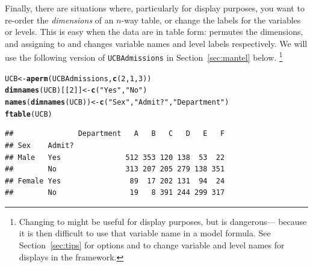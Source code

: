 \documentclass[10pt,twoside]{article}\usepackage[]{graphicx}\usepackage[]{color}
\makeatletter
\newcommand{\hlnum}[1]{\textcolor[rgb]{0.686,0.059,0.569}{#1}}%
\newcommand{\hlstr}[1]{\textcolor[rgb]{0.192,0.494,0.8}{#1}}%
\newcommand{\hlstd}[1]{\textcolor[rgb]{0.345,0.345,0.345}{#1}}%
\newcommand{\hlkwb}[1]{\textcolor[rgb]{0.69,0.353,0.396}{#1}}%
\newcommand{\hlkwd}[1]{\textcolor[rgb]{0.737,0.353,0.396}{\textbf{#1}}}%
\newenvironment{kframe}{%
 \def\at@end@of@kframe{}%
 \ifinner\ifhmode%
  \def\at@end@of@kframe{\end{minipage}}%
  \begin{minipage}{\columnwidth}%
 \fi\fi%
 \def\FrameCommand##1{\hskip\@totalleftmargin \hskip-\fboxsep
 \colorbox{shadecolor}{##1}\hskip-\fboxsep
     \hskip-\linewidth \hskip-\@totalleftmargin \hskip\columnwidth}%
 \MakeFramed {\advance\hsize-\width
   \@totalleftmargin\z@ \linewidth\hsize
   \@setminipage}}%
 {\par\unskip\endMakeFramed%
 \at@end@of@kframe}
\newenvironment{knitrout}{}{} %
\newcommand{\secref}[1]{Section~\ref{#1}}
\newcommand{\data}[1]{\texttt{#1}}
\newcommand{\codefun}[1]{\code{#1()}}
\makeatother
\begin{document}
Finally, there are situations where, particularly for display purposes, you
want to re-order the \emph{dimensions} of an $n$-way table, or change the
labels for the variables or levels.
This is easy when the data are in table form: \codefun{aperm} permutes
the dimensions, and assigning to  and 
changes variable names and level labels respectively.
We will use the following version of \data{UCBAdmissions} in
\secref{sec:mantel} below.%
\footnote{
Changing  to  might be useful for display purposes, but is
dangerous--- because it is then
difficult to use that variable name in a model formula.
See \secref{sec:tips} for options  and 
to change variable and level names 
for displays in the  framework.
}
\begin{knitrout}
\color{fgcolor}\begin{kframe}
\begin{alltt}
\hlstd{UCB} \hlkwb{<-} \hlkwd{aperm}\hlstd{(UCBAdmissions,} \hlkwd{c}\hlstd{(}\hlnum{2}\hlstd{,} \hlnum{1}\hlstd{,} \hlnum{3}\hlstd{))}
\hlkwd{dimnames}\hlstd{(UCB)[[}\hlnum{2}\hlstd{]]} \hlkwb{<-} \hlkwd{c}\hlstd{(}\hlstr{"Yes"}\hlstd{,} \hlstr{"No"}\hlstd{)}
\hlkwd{names}\hlstd{(}\hlkwd{dimnames}\hlstd{(UCB))} \hlkwb{<-} \hlkwd{c}\hlstd{(}\hlstr{"Sex"}\hlstd{,} \hlstr{"Admit?"}\hlstd{,} \hlstr{"Department"}\hlstd{)}
\hlkwd{ftable}\hlstd{(UCB)}
\end{alltt}
\begin{verbatim}
##               Department   A   B   C   D   E   F
## Sex    Admit?                                   
## Male   Yes               512 353 120 138  53  22
##        No                313 207 205 279 138 351
## Female Yes                89  17 202 131  94  24
##        No                 19   8 391 244 299 317
\end{verbatim}
\end{kframe}
\end{knitrout}
\end{document}
